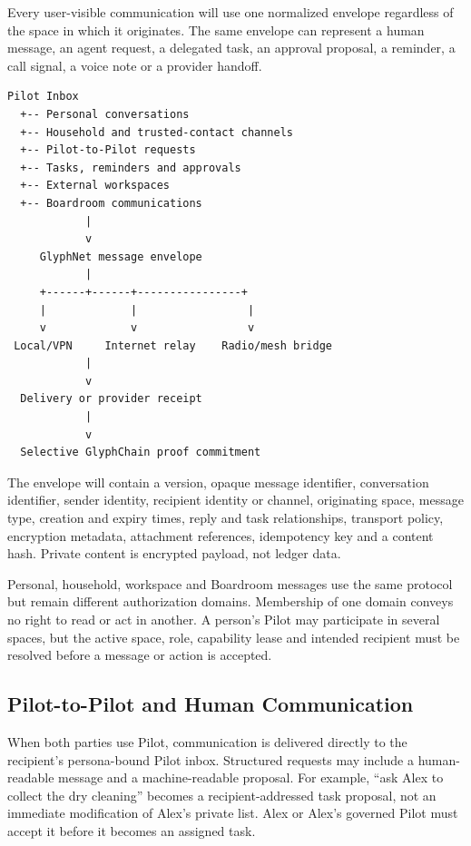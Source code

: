 Every user-visible communication will use one normalized envelope regardless of
the space in which it originates. The same envelope can represent a human
message, an agent request, a delegated task, an approval proposal, a reminder,
a call signal, a voice note or a provider handoff.

\begin{verbatim}
Pilot Inbox
  +-- Personal conversations
  +-- Household and trusted-contact channels
  +-- Pilot-to-Pilot requests
  +-- Tasks, reminders and approvals
  +-- External workspaces
  +-- Boardroom communications
            |
            v
     GlyphNet message envelope
            |
     +------+------+----------------+
     |             |                 |
     v             v                 v
 Local/VPN     Internet relay    Radio/mesh bridge
            |
            v
  Delivery or provider receipt
            |
            v
  Selective GlyphChain proof commitment
\end{verbatim}

The envelope will contain a version, opaque message identifier, conversation
identifier, sender identity, recipient identity or channel, originating space,
message type, creation and expiry times, reply and task relationships, transport
policy, encryption metadata, attachment references, idempotency key and a
content hash. Private content is encrypted payload, not ledger data.

Personal, household, workspace and Boardroom messages use the same protocol but
remain different authorization domains. Membership of one domain conveys no
right to read or act in another. A person's Pilot may participate in several
spaces, but the active space, role, capability lease and intended recipient must
be resolved before a message or action is accepted.

\subsection{Pilot-to-Pilot and Human Communication}

When both parties use Pilot, communication is delivered directly to the
recipient's persona-bound Pilot inbox. Structured requests may include a
human-readable message and a machine-readable proposal. For example, ``ask Alex
to collect the dry cleaning'' becomes a recipient-addressed task proposal, not
an immediate modification of Alex's private list. Alex or Alex's governed Pilot
must accept it before it becomes an assigned task.

